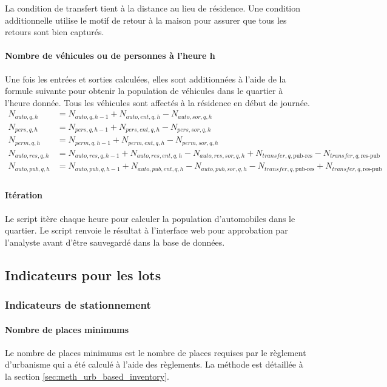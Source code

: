                 La condition de transfert tient à la distance au lieu de résidence. Une condition additionnelle utilise le motif de retour à la maison pour assurer que tous les retours sont bien capturés.
                \paragraph{Nombre de véhicules ou de personnes à l'heure h} Une fois les entrées et sorties calculées, elles sont additionnées  à l'aide de la formule suivante pour obtenir la population de véhicules dans le quartier à l'heure donnée. Tous les véhicules sont affectés à la résidence en début de journée.
                \begin{align}
                    N_{auto,q,h} &=  N_{auto,q,h-1} + N_{auto,ent,q,h}-N_{auto,sor,q,h}\\
                    N_{pers,q,h} &= N_{pers,q,h-1} + N_{pers,ent,q,h} - N_{pers,sor,q,h}\\
                    N_{perm,q,h} &= N_{perm,q,h-1} + N_{perm,ent,q,h} - N_{perm,sor,q,h}\\
                    N_{auto,res,q,h} &= N_{auto,res,q,h-1} + N_{auto,res,ent,q,h} - N_{auto,res,sor,q,h} + N_{transfer,q,\text{pub-res}} - N_{transfer,q,\text{res-pub}}\\
                    N_{auto,pub,q,h} &= N_{auto,pub,q,h-1} + N_{auto,pub,ent,q,h} - N_{auto,pub,sor,q,h} - N_{transfer,q,\text{pub-res}} + N_{transfer,q,\text{res-pub}}\\
                \end{align} 
                \paragraph{Itération} Le script itère chaque heure pour calculer la population d'automobiles dans le quartier. Le script renvoie le résultat à l'interface web pour approbation par l'analyste avant d'être sauvegardé dans la base de données.
    \subsection{Indicateurs pour les lots}
        \subsubsection{Indicateurs de stationnement}
            \paragraph{Nombre de places minimums} Le nombre de places minimums est le nombre de places requises par le règlement d'urbanisme qui a été calculé à l'aide des règlements. La méthode est détaillée à la section \ref{sec:meth_urb_based_inventory}.
            
